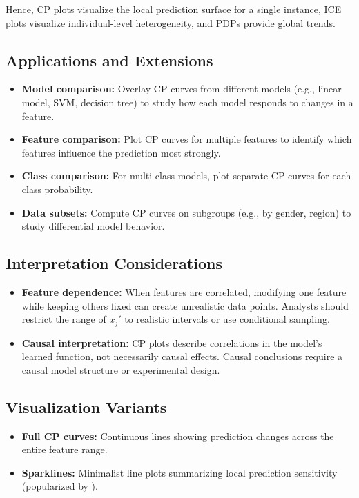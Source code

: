 Hence, CP plots visualize the local prediction surface for a single instance, ICE plots visualize individual-level heterogeneity, and PDPs provide global trends.

\subsection{Applications and Extensions}

\begin{itemize}
    \item \textbf{Model comparison:} Overlay CP curves from different models (e.g., linear model, SVM, decision tree) to study how each model responds to changes in a feature.
    \item \textbf{Feature comparison:} Plot CP curves for multiple features to identify which features influence the prediction most strongly.
    \item \textbf{Class comparison:} For multi-class models, plot separate CP curves for each class probability.
    \item \textbf{Data subsets:} Compute CP curves on subgroups (e.g., by gender, region) to study differential model behavior.
\end{itemize}

\subsection{Interpretation Considerations}

\begin{itemize}
    \item \textbf{Feature dependence:}  
    When features are correlated, modifying one feature while keeping others fixed can create unrealistic data points.  
    Analysts should restrict the range of $x_j'$ to realistic intervals or use conditional sampling.
    \item \textbf{Causal interpretation:}  
    CP plots describe correlations in the model’s learned function, not necessarily causal effects.  
    Causal conclusions require a causal model structure or experimental design.
\end{itemize}

\subsection{Visualization Variants}

\begin{itemize}
    \item \textbf{Full CP curves:} Continuous lines showing prediction changes across the entire feature range.
    \item \textbf{Sparklines:} Minimalist line plots summarizing local prediction sensitivity (popularized by \citet{Tufte1983Sparklines}).
\end{itemize}

